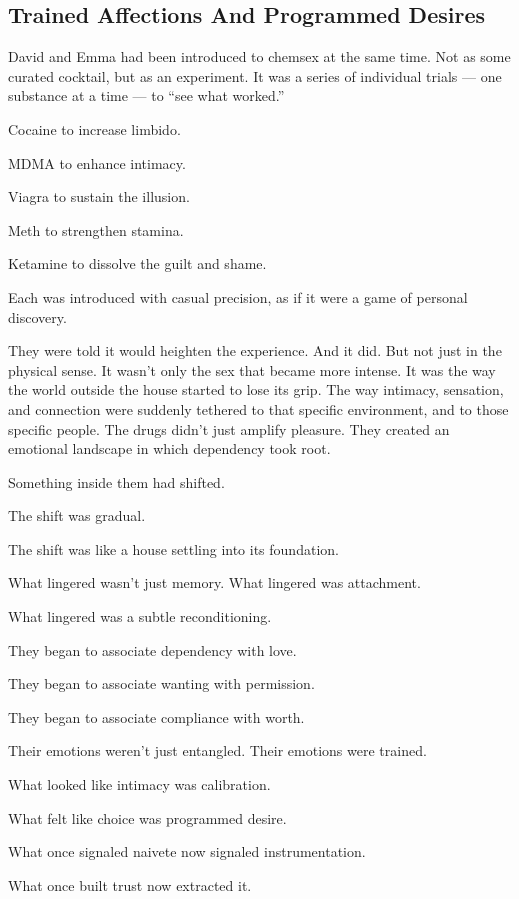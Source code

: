 
\subsection{Trained Affections And Programmed Desires}

David and Emma had been introduced to chemsex at the same time. Not as some curated cocktail, but as an experiment. 
It was a series of individual trials --- one substance at a time --- to ``see what worked.'' 

Cocaine to increase limbido. 

MDMA to enhance intimacy. 

Viagra to sustain the illusion. 

Meth to strengthen stamina. 

Ketamine to dissolve the guilt and shame. 

Each was introduced with casual precision, as if it were a game of personal discovery.

They were told it would heighten the experience. And it did. But not just in the physical sense. It wasn’t only 
the sex that became more intense. It was the way the world outside the house started to lose its grip. 
The way intimacy, sensation, and connection were suddenly tethered to that specific environment, and to those 
specific people. The drugs didn’t just amplify pleasure. They created an emotional landscape in which 
dependency took root.

Something inside them had shifted. 

The shift was gradual. 

The shift was like a house settling into its foundation. 

What lingered wasn’t just memory. 
What lingered was attachment. 

What lingered was a subtle reconditioning. 

They began to associate dependency with love. 

They began to associate wanting with permission.

They began to associate compliance with worth.

Their emotions weren’t just entangled. 
Their emotions were trained.

What looked like intimacy was calibration.

What felt like choice was programmed desire.

What once signaled naivete now signaled instrumentation.

What once built trust now extracted it.

